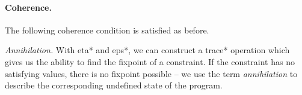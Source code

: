 \documentclass[preprint]{sigplanconf}
\begin{document}





\paragraph*{Coherence.}
The following coherence condition is satisfied as before.


\emph{Annihilation.}  
With {{eta*}} and {{eps*}}, we can construct a {{trace*}} operation
which gives us the ability to find the fixpoint of a constraint.  If
the constraint has no satisfying values, there is no fixpoint possible
-- we use the term \emph{annihilation} to describe the corresponding
undefined state of the program.
\end{document}
